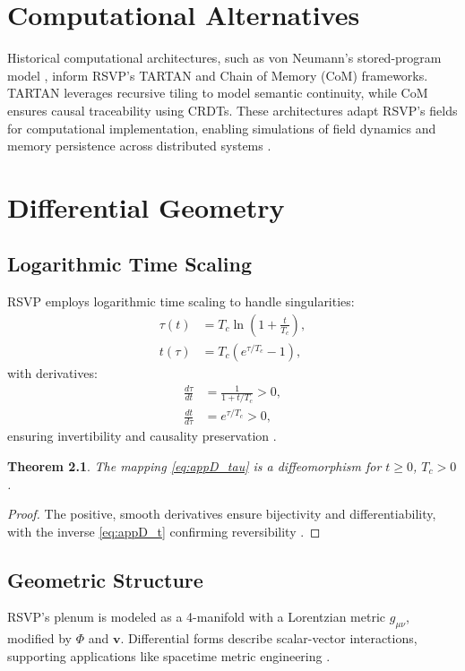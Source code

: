 \documentclass[12pt]{report}
\newtheorem{theorem}{Theorem}[chapter]
\newcommand{\PhiRSVP}{\Phi}
\newcommand{\vRSVP}{\mathbf{v}}
\begin{document}
\chapter{Computational Alternatives}
\label{app:C}
Historical computational architectures, such as von Neumann’s stored-program model \citep{vonNeumann1945}, inform RSVP’s TARTAN and Chain of Memory (CoM) frameworks. TARTAN leverages recursive tiling to model semantic continuity, while CoM ensures causal traceability using CRDTs. These architectures adapt RSVP’s fields for computational implementation, enabling simulations of field dynamics and memory persistence across distributed systems \citep{RSVPMeta2025}.

\chapter{Differential Geometry}
\label{app:D}
\section{Logarithmic Time Scaling}
RSVP employs logarithmic time scaling to handle singularities:
\begin{align}
\tau(t) &= T_c \ln\left(1 + \frac{t}{T_c}\right), \label{eq:appD_tau} \\
t(\tau) &= T_c \left(e^{\tau / T_c} - 1\right), \label{eq:appD_t}
\end{align}
with derivatives:
\begin{align}
\frac{d\tau}{dt} &= \frac{1}{1 + t/T_c} > 0, \\
\frac{dt}{d\tau} &= e^{\tau / T_c} > 0,
\end{align}
ensuring invertibility and causality preservation \citep{Spivak1999}.

\begin{theorem}
The mapping \eqref{eq:appD_tau} is a diffeomorphism for \(t \geq 0\), \(T_c > 0\).
\end{theorem}
\begin{proof}
The positive, smooth derivatives ensure bijectivity and differentiability, with the inverse \eqref{eq:appD_t} confirming reversibility \citep{Spivak1999}.
\end{proof}

\section{Geometric Structure}
RSVP’s plenum is modeled as a 4-manifold with a Lorentzian metric \(g_{\mu\nu}\), modified by \(\PhiRSVP\) and \(\vRSVP\). Differential forms describe scalar-vector interactions, supporting applications like spacetime metric engineering \citep{RSVPMeta2025}.
\end{document}
